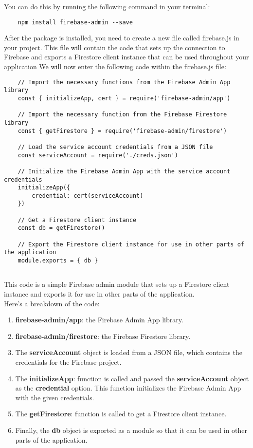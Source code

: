 \documentclass{article}
\begin{document}
You can do this by running the following command in your terminal:
\begin{verbatim}
    npm install firebase-admin --save
  \end{verbatim}
After the package is installed, you need to create a new file called firebase.js in your project. This file will contain the code that sets up the connection to Firebase and exports a Firestore client instance that can be used throughout your application
We will now enter the following code within the firebase.js file:

\begin{verbatim}
    // Import the necessary functions from the Firebase Admin App library
    const { initializeApp, cert } = require('firebase-admin/app') 
    
    // Import the necessary function from the Firebase Firestore library
    const { getFirestore } = require('firebase-admin/firestore') 
    
    // Load the service account credentials from a JSON file
    const serviceAccount = require('./creds.json') 
    
    // Initialize the Firebase Admin App with the service account credentials
    initializeApp({
        credential: cert(serviceAccount) 
    })
    
    // Get a Firestore client instance
    const db = getFirestore() 
    
    // Export the Firestore client instance for use in other parts of the application
    module.exports = { db }
    
\end{verbatim}
This code is a simple Firebase admin module that sets up a Firestore client instance and exports it for use in other parts of the application.\\
Here's a breakdown of the code:

\begin{enumerate}
    \item \textbf{firebase-admin/app}: the Firebase Admin App library.
    \item \textbf{firebase-admin/firestore}:  the Firebase Firestore library.
    \item The \textbf{serviceAccount} object is loaded from a JSON file, which contains the credentials for the Firebase project.
    \item The \textbf{initializeApp}: function is called and passed the \textbf{serviceAccount} object as the \textbf{credential} option. This function initializes the Firebase Admin App with the given credentials.
    \item The \textbf{getFirestore}: function is called to get a Firestore client instance.
    \item Finally, the \textbf{db} object is exported as a module so that it can be used in other parts of the application.
\end{enumerate}
\end{document}
